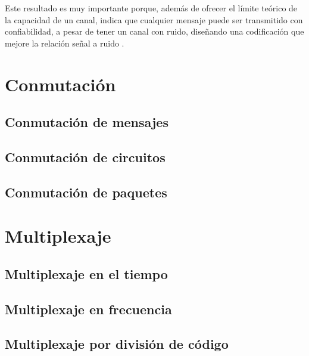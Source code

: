 \documentclass[
]{book}
\begin{document}
Este resultado es muy importante porque, además de ofrecer el límite teórico de la capacidad de un canal, indica que cualquier mensaje puede ser transmitido con confiabilidad, a pesar de tener un canal con ruido, diseñando una codificación que mejore la relación señal a ruido \citep{Rheingold:TFT}.

\hypertarget{conmutaciuxf3n}{%
\section{Conmutación}\label{conmutaciuxf3n}}

\hypertarget{conmutaciuxf3n-de-mensajes}{%
\subsection{Conmutación de mensajes}\label{conmutaciuxf3n-de-mensajes}}

\hypertarget{conmutaciuxf3n-de-circuitos}{%
\subsection{Conmutación de circuitos}\label{conmutaciuxf3n-de-circuitos}}

\hypertarget{conmutaciuxf3n-de-paquetes}{%
\subsection{Conmutación de paquetes}\label{conmutaciuxf3n-de-paquetes}}

\hypertarget{multiplexaje}{%
\section{Multiplexaje}\label{multiplexaje}}

\hypertarget{multiplexaje-en-el-tiempo}{%
\subsection{Multiplexaje en el tiempo}\label{multiplexaje-en-el-tiempo}}

\hypertarget{multiplexaje-en-frecuencia}{%
\subsection{Multiplexaje en frecuencia}\label{multiplexaje-en-frecuencia}}

\hypertarget{multiplexaje-por-divisiuxf3n-de-cuxf3digo}{%
\subsection{Multiplexaje por división de código}\label{multiplexaje-por-divisiuxf3n-de-cuxf3digo}}
\end{document}
